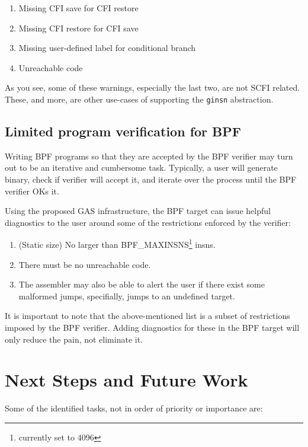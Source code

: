 \documentclass{article} \usepackage[a4paper, total={6in, 8in}]{geometry}
\begin{document}
\begin{enumerate}
\item Missing CFI save for CFI restore
\item Missing CFI restore for CFI save
\item Missing user-defined label for conditional branch
\item Unreachable code
\end{enumerate}

As you see, some of these warnings, especially the last two, are not SCFI
related.  These, and more, are other use-cases of supporting the \texttt{ginsn}
abstraction.

\subsection{Limited program verification for BPF}
Writing BPF programs so that they are accepted by the BPF verifier may turn out
to be an iterative and cumbersome task.  Typically, a user will generate
binary, check if verifier will accept it, and iterate over the process until
the BPF verifier OKs it.

Using the proposed GAS infrastructure, the BPF target can issue helpful diagnostics to the
user around some of the restrictions enforced by the verifier:
\begin{enumerate}
\item (Static size) No larger than BPF\_MAXINSNS\footnote{currently set to 4096} insns.
\item There must be no unreachable code.
\item The assembler may also be able to alert the user if there exist some
malformed jumps, specifially, jumps to an undefined target.
\end{enumerate}

It is important to note that the above-mentioned list is a subset of
restrictions imposed by the BPF verifier.  Adding diagnostics for these in the
BPF target will only reduce the pain, not eliminate it.

\section{Next Steps and Future Work}

Some of the identified tasks, not in order of priority or importance are:
\end{document}
